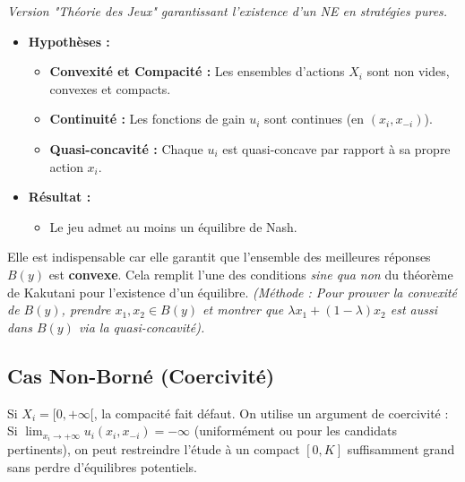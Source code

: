 \documentclass[10pt,a4paper]{article}
\begin{document}
\begin{tcolorbox}[colback=white, title=\textbf{3. Théorème de Glicksberg (Synthèse Jeux)}]
\textit{Version "Théorie des Jeux" garantissant l'existence d'un NE en stratégies pures.}
\begin{itemize}
    \item \textbf{Hypothèses :}
    \begin{itemize}
        \item \textbf{Convexité et Compacité :} Les ensembles d'actions $X_i$ sont non vides, convexes et compacts.
        \item \textbf{Continuité :} Les fonctions de gain $u_i$ sont continues (en $(x_i, x_{-i})$).
        \item \textbf{Quasi-concavité :} Chaque $u_i$ est quasi-concave par rapport à sa propre action $x_i$.
    \end{itemize}
    \item \textbf{Résultat :}
    \begin{itemize}
        \item Le jeu admet au moins un équilibre de Nash.
    \end{itemize}
\end{itemize}
\end{tcolorbox}

\begin{tcolorbox}[colback=yellow!10, title=Pourquoi la quasi-concavité est cruciale ?]
Elle est indispensable car elle garantit que l'ensemble des meilleures réponses $B(y)$ est \textbf{convexe}.
Cela remplit l'une des conditions \textit{sine qua non} du théorème de Kakutani pour l'existence d'un équilibre.
\textit{(Méthode : Pour prouver la convexité de $B(y)$, prendre $x_1, x_2 \in B(y)$ et montrer que $\lambda x_1 + (1-\lambda)x_2$ est aussi dans $B(y)$ via la quasi-concavité).}
\end{tcolorbox}

\subsection{Cas Non-Borné (Coercivité)}
Si $X_i = [0, +\infty[$, la compacité fait défaut. On utilise un argument de coercivité :
Si $\lim_{x_i \to +\infty} u_i(x_i, x_{-i}) = -\infty$ (uniformément ou pour les candidats pertinents), on peut restreindre l'étude à un compact $[0, K]$ suffisamment grand sans perdre d'équilibres potentiels.
\end{document}

